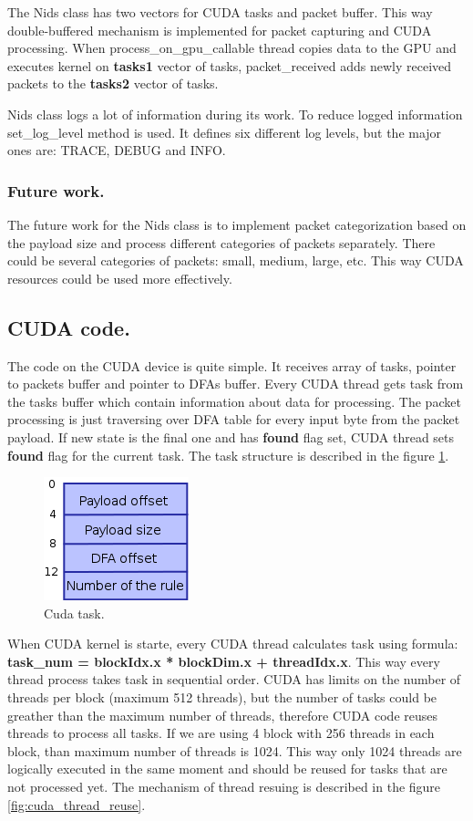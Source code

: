 \documentclass[thesis=M,english]{FITthesis}[2011/07/15]
\begin{document}
The Nids class has two vectors for CUDA tasks and packet buffer. This way double-buffered mechanism is implemented for packet capturing and CUDA processing. When process\_on\_gpu\_callable thread copies data to the GPU and executes kernel on \textbf{tasks1} vector of tasks, packet\_received adds newly received packets to the \textbf{tasks2} vector of tasks.

Nids class logs a lot of information during its work. To reduce logged information set\_log\_level method is used. It defines six different log levels, but the major ones are: TRACE, DEBUG and INFO.

\subsubsection*{Future work.}
The future work for the Nids class is to implement packet categorization based on the payload size and process different categories of packets separately. There could be several categories of packets: small, medium, large, etc. This way CUDA resources could be used more effectively.

\subsection{CUDA code.}
The code on the CUDA device is quite simple. It receives array of tasks, pointer to packets buffer and pointer to DFAs buffer. Every CUDA thread gets task from the tasks buffer which contain information about data for processing. The packet processing is just traversing over DFA table for every input byte from the packet payload. If new state is the final one and has \textbf{found} flag  set, CUDA thread sets \textbf{found} flag for the current task. The task structure is described in the figure \ref{fig:cuda_task}.

\begin{figure}[h]
\centering
\includegraphics[scale=0.5]{images/cuda_task.png}
\caption{Cuda task.}
\label{fig:cuda_task}
\end{figure}

When CUDA kernel is starte, every CUDA thread calculates task using formula: \textbf{task\_num = blockIdx.x * blockDim.x + threadIdx.x}. This way every thread process takes task in sequential order. CUDA has limits on the number of threads per block (maximum 512 threads), but the number of tasks could be greather than the maximum number of threads, therefore CUDA code reuses threads to process all tasks. If we are using 4 block with 256 threads in each block, than maximum number of threads is 1024. This way only 1024 threads are logically executed in the same moment and should be reused for tasks that are not processed yet. The mechanism of thread resuing is described in the figure \ref{fig:cuda_thread_reuse}.
\end{document}
